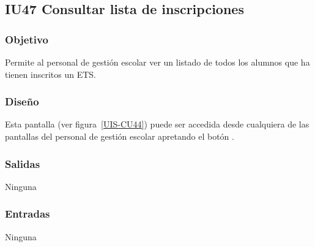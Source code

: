 
\subsection{IU47 Consultar lista de inscripciones}

\subsubsection{Objetivo}
Permite al personal de gestión escolar ver un listado de todos los alumnos que ha tienen inscritos un ETS.
\subsubsection{Diseño}
Esta pantalla  (ver figura~\ref{UIS-CU44}) puede ser accedida desde cualquiera de las pantallas del personal de gestión escolar apretando el botón .


\subsubsection{Salidas}
Ninguna
\subsubsection{Entradas}
Ninguna
